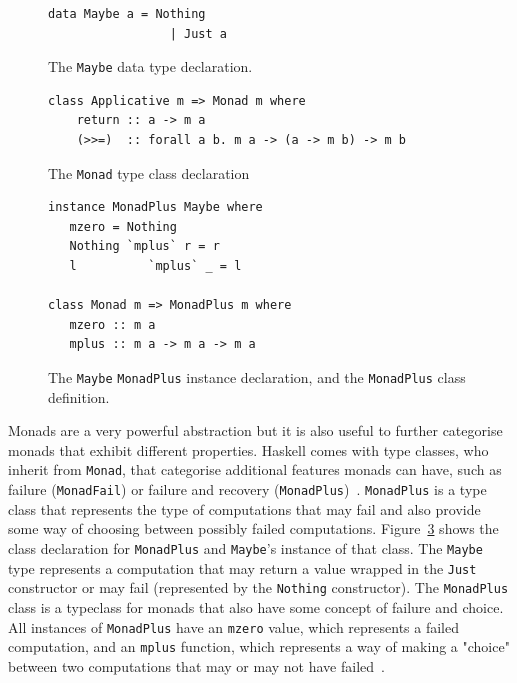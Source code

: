 \begin{figure}[t]
\begin{lstlisting}
data Maybe a = Nothing
                 | Just a
\end{lstlisting}
\caption{The \texttt{Maybe} data type declaration.}
\label{maybeDecl}
\end{figure}

\begin{figure}[t]
\begin{lstlisting}
class Applicative m => Monad m where
	return :: a -> m a
    (>>=)  :: forall a b. m a -> (a -> m b) -> m b
\end{lstlisting}
\caption{The \texttt{Monad} type class declaration}
\label{monadTC}
\end{figure}

\begin{figure}[t]
\begin{lstlisting}                 
instance MonadPlus Maybe where
   mzero = Nothing
   Nothing `mplus` r = r
   l          `mplus` _ = l
                 
class Monad m => MonadPlus m where
   mzero :: m a
   mplus :: m a -> m a -> m a
\end{lstlisting}
\caption{The \texttt{Maybe} \texttt{MonadPlus} instance declaration, and the \texttt{MonadPlus} class definition.}
\label{maybeMonadPlus}
\end{figure}

Monads are a very powerful abstraction but it is also useful to further categorise monads that exhibit different properties. Haskell comes with type classes, who inherit from \texttt{Monad}, that categorise additional features monads can have, such as failure (\texttt{MonadFail}) or failure and recovery (\texttt{MonadPlus})~\citep{typeclassopedia}. \texttt{MonadPlus} is a type class that represents the type of computations that may fail and also provide some way of choosing between possibly failed computations. Figure~\ref{maybeMonadPlus} shows the class declaration for \texttt{MonadPlus} and \texttt{Maybe}'s instance of that class. The \texttt{Maybe} type represents a computation that may return a value wrapped in the \texttt{Just} constructor or may fail (represented by the \texttt{Nothing} constructor). The \texttt{MonadPlus} class is a typeclass for monads that also have some concept of failure and choice. All instances of \texttt{MonadPlus} have an \texttt{mzero} value, which represents a failed computation, and an \texttt{mplus} function, which represents a way of making a "choice" between two computations that may or may not have failed~\citep{typeclassopedia}. 



